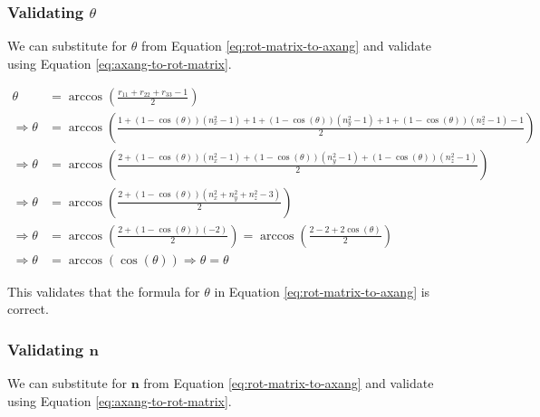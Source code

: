 \subsubsection*{Validating $\theta$}

We can substitute for $\theta$ from Equation \ref{eq:rot-matrix-to-axang} and validate using Equation \ref{eq:axang-to-rot-matrix}.

\begin{equation}
    \begin{split}
        \theta &= \arccos \left ( \frac{r_{11} + r_{22} + r_{33} - 1}{2} \right ) \\
        \Rightarrow \theta &= \arccos \left ( \frac{1 + (1-\cos(\theta)) (n_x^2 - 1) + 1 + (1-\cos(\theta))(n_y^2 - 1) + 1 + (1-\cos(\theta)) (n_z^2 - 1) - 1}{2} \right ) \\
        \Rightarrow \theta &= \arccos \left ( \frac{2 + (1-\cos(\theta)) (n_x^2 - 1) + (1-\cos(\theta))(n_y^2 - 1) + (1-\cos(\theta)) (n_z^2 - 1)}{2} \right ) \\
        \Rightarrow \theta &= \arccos \left ( \frac{2 + (1-\cos(\theta))(n_x^2 + n_y^2 + n_z^2 - 3)}{2} \right ) \\
        \Rightarrow \theta &= \arccos \left ( \frac{2 + (1-\cos(\theta))(-2)}{2} \right ) = \arccos \left ( \frac{2 - 2 + 2 \cos(\theta)}{2} \right ) \\
        \Rightarrow \theta &= \arccos \left ( \cos(\theta) \right ) \Rightarrow \theta = \theta
    \end{split}
\end{equation}

This validates that the formula for $\theta$ in Equation \ref{eq:rot-matrix-to-axang} is correct.

\subsubsection*{Validating $\mathbf{n}$}

We can substitute for $\mathbf{n}$ from Equation \ref{eq:rot-matrix-to-axang} and validate using Equation \ref{eq:axang-to-rot-matrix}.

